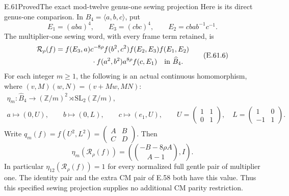 \begin{statement}{E.61}{Proved}{The exact mod-twelve genus-one sewing projection}
Here is its direct genus-one comparison.  In $B_4=\langle a,b,c\rangle$,
put
\[
 E_1=(aba)^4,\qquad E_3=(cbc)^4,\qquad
 E_2=cba b^{-1}c^{-1}.
 \tag{E.61.5}
\]
The multiplier-one sewing word, with every frame term retained, is
\[
\begin{split}
 \mathcal R_\rho(f)={}&f(E_3,a)c^{-8\rho}f(b^2,c^2)
       f(E_2,E_3)f(E_1,E_2)\\
       &\hspace{13mm}\cdot f(a^2,b^2)a^{8\rho}f(c,E_1)
       \quad\hbox{in }\widehat B_4.
\end{split}
 \tag{E.61.6}
\]
For each integer $m\geq1$, the following is an actual continuous
homomorphism, where $(v,M)(w,N)=(v+Mw,MN)$:
\[
\begin{gathered}
 \eta_m:\widehat B_4\longrightarrow
       (\mathbb Z/m)^2\rtimes\mathrm{SL}_2(\mathbb Z/m),\\
 a\longmapsto(0,U),\qquad b\longmapsto(0,L),\qquad
 c\longmapsto(e_1,U),\qquad
 U=\begin{pmatrix}1&1\\0&1\end{pmatrix},\quad
 L=\begin{pmatrix}1&0\\-1&1\end{pmatrix}.
\end{gathered}
 \tag{E.61.7}
\]
Write $q_m(f)=f(U^2,L^2)=\left(\begin{smallmatrix}A&B\\C&D\end{smallmatrix}\right)$.
Then
\[
 \eta_m(\mathcal R_\rho(f))=
       \left(\binom{-B-8\rho A}{A-1},I\right).
 \tag{E.61.8}
\]
In particular $\eta_{12}(\mathcal R_\rho(f))=1$ for every normalized
full gentle pair of multiplier one.  The identity pair and the extra
CM pair of E.58 both have this value.  Thus this specified sewing
projection supplies no additional CM parity restriction.
\end{statement}
